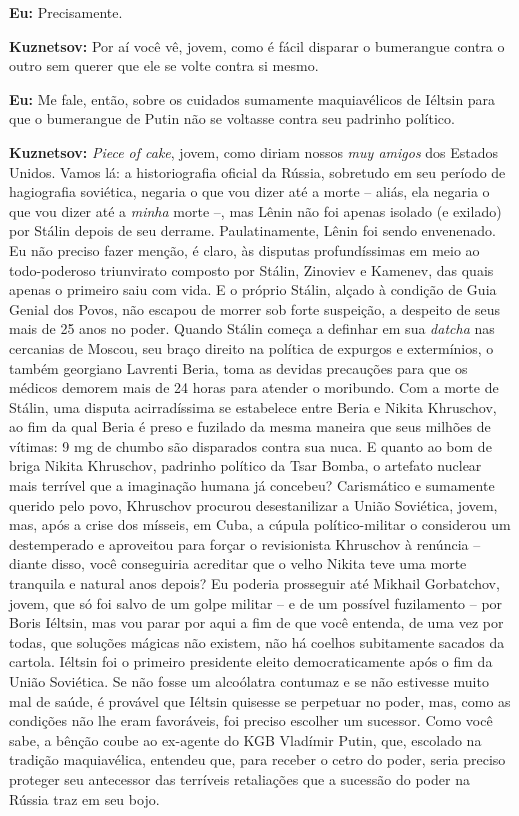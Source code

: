 \textbf{Eu:} Precisamente.

\textbf{Kuznetsov:} Por aí você vê, jovem, como é fácil disparar o
bumerangue contra o outro sem querer que ele se volte contra si mesmo.

\textbf{Eu:} Me fale, então, sobre os cuidados sumamente maquiavélicos
de Iéltsin para que o bumerangue de Putin não se voltasse contra seu
padrinho político.

\textbf{Kuznetsov:} \emph{Piece of cake}, jovem, como diriam nossos
\emph{muy amigos} dos Estados Unidos. Vamos lá: a historiografia oficial
da Rússia, sobretudo em seu período de hagiografia soviética, negaria o
que vou dizer até a morte -- aliás, ela negaria o que vou dizer até a
\emph{minha} morte --, mas Lênin não foi apenas isolado (e exilado) por
Stálin depois de seu derrame. Paulatinamente, Lênin foi sendo
envenenado. Eu não preciso fazer menção, é claro, às disputas
profundíssimas em meio ao todo-poderoso triunvirato composto por Stálin,
Zinoviev e Kamenev, das quais apenas o primeiro saiu com vida. E o
próprio Stálin, alçado à condição de Guia Genial dos Povos, não escapou
de morrer sob forte suspeição, a despeito de seus mais de 25 anos no
poder. Quando Stálin começa a definhar em sua \emph{datcha} nas
cercanias de Moscou, seu braço direito na política de expurgos e
extermínios, o também georgiano Lavrenti Beria, toma as devidas
precauções para que os médicos demorem mais de 24 horas para atender o
moribundo. Com a morte de Stálin, uma disputa acirradíssima se
estabelece entre Beria e Nikita Khruschov, ao fim da qual Beria é preso
e fuzilado da mesma maneira que seus milhões de vítimas: 9 mg de chumbo
são disparados contra sua nuca. E quanto ao bom de briga Nikita
Khruschov, padrinho político da Tsar Bomba, o artefato nuclear mais
terrível que a imaginação humana já concebeu? Carismático e sumamente
querido pelo povo, Khruschov procurou desestanilizar a União Soviética,
jovem, mas, após a crise dos mísseis, em Cuba, a cúpula político-militar
o considerou um destemperado e aproveitou para forçar o revisionista
Khruschov à renúncia -- diante disso, você conseguiria acreditar que o
velho Nikita teve uma morte tranquila e natural anos depois? Eu poderia
prosseguir até Mikhail Gorbatchov, jovem, que só foi salvo de um golpe
militar -- e de um possível fuzilamento -- por Boris Iéltsin, mas vou
parar por aqui a fim de que você entenda, de uma vez por todas, que
soluções mágicas não existem, não há coelhos subitamente sacados da
cartola. Iéltsin foi o primeiro presidente eleito democraticamente após
o fim da União Soviética. Se não fosse um alcoólatra contumaz e se não
estivesse muito mal de saúde, é provável que Iéltsin quisesse se
perpetuar no poder, mas, como as condições não lhe eram favoráveis, foi
preciso escolher um sucessor. Como você sabe, a bênção coube ao
ex-agente do KGB Vladímir Putin, que, escolado na tradição maquiavélica,
entendeu que, para receber o cetro do poder, seria preciso proteger seu
antecessor das terríveis retaliações que a sucessão do poder na Rússia
traz em seu bojo.

